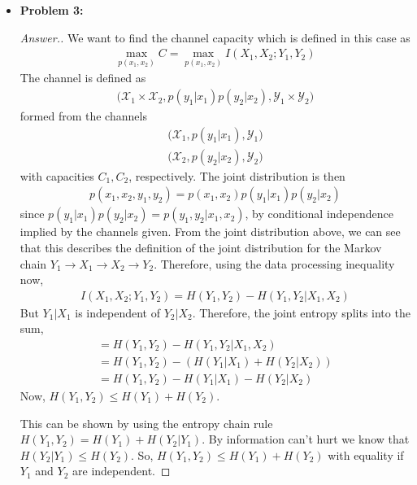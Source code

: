 \documentclass[10pt,twoside]{article}
\begin{document}
\begin{itemize}
    \item\textbf{Problem 3:} \newline
    \noindent\makebox[\linewidth]{\rule{18cm}{0.4pt}}
    \begin{proof}[Answer.]
    We want to find the channel capacity which is defined in this case as
    \begin{gather*}
        \max_{p(x_1, x_2)} C = \max_{p(x_1, x_2)} I(X_1, X_2;Y_1, Y_2)
    \end{gather*}
    The channel is defined as
    \begin{gather*}
        \Big( \mathcal{X}_1\times \mathcal{X}_2, p(y_1|x_1)p(y_2|x_2),\mathcal{Y}_1\times \mathcal{Y}_2 \Big)
    \end{gather*}
    formed from the channels
    \begin{gather*}
        \Big(\mathcal{X}_1, p(y_1|x_1), \mathcal{Y}_1 \Big) \\
        \Big(\mathcal{X}_2, p(y_2|x_2), \mathcal{Y}_2 \Big)
    \end{gather*}
    with capacities $C_1, C_2$, respectively. The joint distribution is then
    \begin{gather*}
        p(x_1, x_2, y_1, y_2) = p(x_1, x_2)p(y_1|x_1)p(y_2|x_2)
    \end{gather*}
    since $p(y_1|x_1)p(y_2|x_2) = p(y_1, y_2|x_1, x_2)$, by conditional independence implied by the channels given. From the joint distribution above, we can see that this describes the definition of the joint distribution for the Markov chain $Y_1 \to X_1 \to X_2 \to Y_2$. Therefore, using the data processing inequality now,
    \begin{gather*}
        I(X_1, X_2;Y_1,Y_2) = H(Y_1, Y_2) - H(Y_1, Y_2|X_1, X_2)
    \end{gather*}
    But $Y_1|X_1$ is independent of $Y_2|X_2$. Therefore, the joint entropy splits into the sum,
    \begin{gather*}
        = H(Y_1, Y_2) - H(Y_1, Y_2|X_1, X_2) \\
        = H(Y_1, Y_2) - (H(Y_1|X_1) + H(Y_2|X_2)) \\
        = H(Y_1, Y_2) - H(Y_1|X_1) - H(Y_2|X_2)
    \end{gather*}
    Now, $H(Y_1, Y_2)\leq H(Y_1) + H(Y_2)$. 
    
    This can be shown by using the entropy chain rule $H(Y_1, Y_2) = H(Y_1) + H(Y_2 | Y_1)$. By information can't hurt we know that $H(Y_2|Y_1)\leq H(Y_2)$. So, $H(Y_1, Y_2)\leq H(Y_1) + H(Y_2)$ with equality if $Y_1$ and $Y_2$ are independent.


\end{proof}
\end{itemize}
\end{document}
